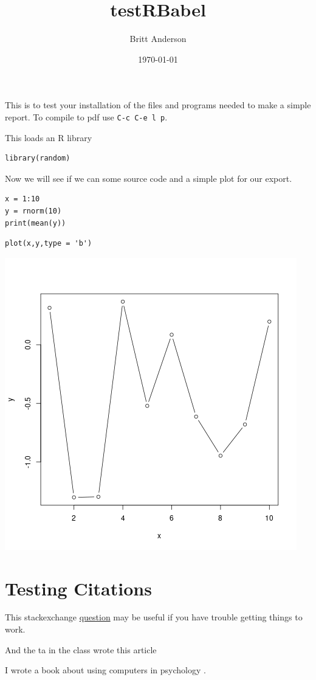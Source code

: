 \documentclass{article}
\author{Britt Anderson}
\date{\today}
\title{testRBabel}
\begin{document}
\maketitle
\tableofcontents

This is to test your installation of the files and programs needed to make a simple report. To compile to pdf use \texttt{C-c C-e l p}.

This loads an R library
\begin{verbatim}
library(random)
\end{verbatim}


Now we will see if we can some source code and a simple plot for our export.

\begin{verbatim}
x = 1:10
y = rnorm(10)
print(mean(y))
\end{verbatim}

\begin{verbatim}
plot(x,y,type = 'b')
\end{verbatim}

\begin{center}
\includegraphics[width=.9\linewidth]{simplePlot.png}
\end{center}

\section{Testing Citations}
\label{sec:org04424a9}

This stackexchange \href{https://tex.stackexchange.com/questions/114864/how-to-get-bibtex-to-work-with-org-mode-latex-export}{question} may be useful if you have trouble getting things to work. 

And the ta in the class wrote this article \cite{turpin2019bullshit}


I wrote a book about using computers in psychology \cite{anderson2014computational}.





\end{document}
